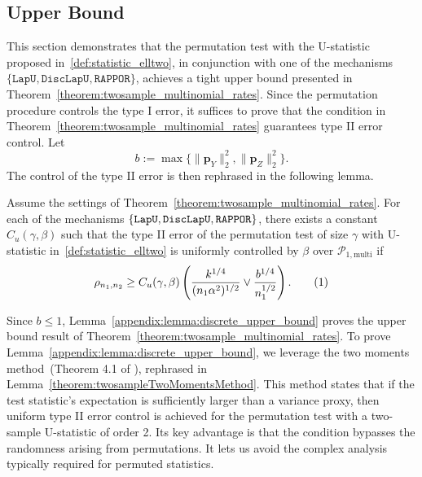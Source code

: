 \documentclass[twoside,11pt]{article}
\newcommand\numberthis{\addtocounter{equation}{1}\tag{\theequation}}
\newcommand{\rvTwo}{Y}
\newcommand{\rvThree}{Z}
\newcommand{\normSqMultinomMax}{b}
\newcommand{\alphabetSize}{k} %
\newcommand{\sampleSize}{n}
\newcommand{\probVec}{\mathbf{p}} %
\newcommand{\privacyParameter}{\alpha} %
\newcommand{\maxErrorTypeTwo}{\beta} %
\newcommand{\maxErrorTypeOne}{\gamma} %
\newcommand{\separation}{\rho} %
\begin{document}
\begin{appendix}
	\subsection{Upper Bound} \label{sec: upper bound}
	This section demonstrates that the permutation test with the U-statistic proposed in~\eqref{def:statistic_elltwo}, in conjunction with one of the mechanisms $\{\texttt{LapU}, \texttt{DiscLapU}, \texttt{RAPPOR}\}$, achieves a tight upper bound presented in Theorem~\ref{theorem:twosample_multinomial_rates}.
	Since the permutation procedure controls the type I error, it suffices to prove that the condition in Theorem~\ref{theorem:twosample_multinomial_rates} guarantees type II error control.
	Let 
	\begin{equation}\label{definition:maximum_norm_squared}
		\normSqMultinomMax
		:=
		\max \{
		\|\probVec_{\rvTwo}\|_2^2,
		\|\probVec_{\rvThree}\|_2^2
		\}.
	\end{equation}
	The control of the type II error  is then rephrased in the following lemma.
	\begin{lemma}\label{appendix:lemma:discrete_upper_bound}
		Assume the settings of Theorem~\ref{theorem:twosample_multinomial_rates}.
		For each of the mechanisms $\{\textnormal{\texttt{LapU}}, \textnormal{\texttt{DiscLapU}}, \textnormal{\texttt{RAPPOR}}\}$, there exists a constant $C_u(\gamma, \beta)$ such that the type II error of the permutation test of size $\maxErrorTypeOne$ with U-statistic in~\eqref{def:statistic_elltwo} is uniformly controlled by $\maxErrorTypeTwo$ over $\mathcal{P}_{1,\mathrm{multi}}$ if
		\begin{align*}
			\separation_{\sampleSize_1, \sampleSize_2}
			\geq
			C_u(\gamma, \beta)
			\left(
			\frac
			{\alphabetSize^{1/4}}
			{(\sampleSize_1 \privacyParameter^2)^{1/2}}
			\vee
			\frac
			{{b}^{1/4}}
			{\sampleSize_1^{1/2}}
			\right).
			\numberthis \label{eq:two_moments_two_sample_cond_merge}
		\end{align*}
	\end{lemma} 
	Since ${b} \leq 1$, Lemma~\ref{appendix:lemma:discrete_upper_bound} proves the upper bound result of Theorem~\ref{theorem:twosample_multinomial_rates}. To prove Lemma~\ref{appendix:lemma:discrete_upper_bound}, we leverage the two moments method~(Theorem 4.1 of \citet{kim_minimax_2022}), rephrased in Lemma~\ref{theorem:twosampleTwoMomentsMethod}.
	This method states that if the test statistic’s expectation is sufficiently larger than a variance proxy, then uniform type II error control is achieved for the permutation test with a two-sample U-statistic of order 2.
	Its  key advantage is that the condition  bypasses the randomness arising from permutations. It lets us avoid the complex analysis typically required for permuted statistics.
	

\end{appendix}
\end{document}
